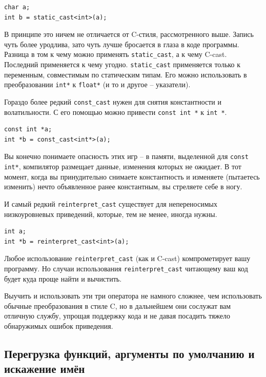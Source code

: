 \documentclass[a4paper,12pt,oneside]{article}
\begin{document}
\begin{lstlisting}
char a;
int b = static_cast<int>(a);
\end{lstlisting}

В принципе это ничем не отличается от C-стиля, рассмотренного выше. Запись чуть более уродлива, зато чуть лучше бросается в глаза в коде программы. Разница в том к чему можно применять \lstinline!static_cast!, а к чему C-cast. Последний применяется к чему угодно. \lstinline!static_cast! применяется только к переменным, совместимым по статическим типам. Его можно использовать в преобразовании \lstinline!int*! к \lstinline!float*! (и то и другое – указатели). 

Гораздо более редкий \lstinline!const_cast! нужен для снятия константности и волатильности. С его помощью можно привести \lstinline!const int *! к \lstinline!int *!. 

\begin{lstlisting}
const int *a;
int *b = const_cast<int*>(a);
\end{lstlisting}

Вы конечно понимаете опасность этих игр – в памяти, выделенной для \lstinline!const int*!, компилятор размещает данные, изменения которых не ожидает. В тот момент, когда вы принудительно снимаете константность и изменяете (пытаетесь изменить) нечто объявленное ранее константным, вы стреляете себе в ногу.

И самый редкий \lstinline!reinterpret_cast! существует для непереносимых низкоуровневых приведений, которые, тем не менее, иногда нужны.

\begin{lstlisting}
int a;
int *b = reinterpret_cast<int>(a);
\end{lstlisting}

Любое использование \lstinline!reinterpret_cast! (как и C-cast) компрометирует вашу программу. Но случаи использования \lstinline!reinterpret_cast! читающему ваш код будет куда проще найти и вычистить.

Выучить и использовать эти три оператора не намного сложнее, чем использовать обычные преобразования в стиле C, но в дальнейшем они сослужат вам отличную службу, упрощая поддержку кода и не давая посадить тяжело обнаружимых ошибок приведения.

\subsection{Перегрузка функций, аргументы по умолчанию и искажение имён}\label{NameResolution}
\end{document}
